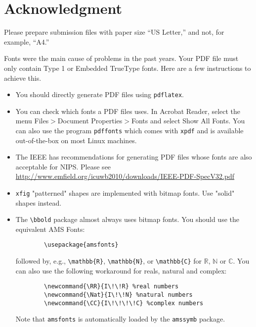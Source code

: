 \documentclass{article}
\begin{document}
	\section{Acknowledgment}
	
	Please prepare submission files with paper size ``US Letter,'' and
	not, for example, ``A4.''
	
	Fonts were the main cause of problems in the past years. Your PDF file
	must only contain Type 1 or Embedded TrueType fonts. Here are a few
	instructions to achieve this.
	
	\begin{itemize}
		
		\item You should directly generate PDF files using \verb+pdflatex+.
		
		\item You can check which fonts a PDF files uses.  In Acrobat Reader,
		select the menu Files$>$Document Properties$>$Fonts and select Show
		All Fonts. You can also use the program \verb+pdffonts+ which comes
		with \verb+xpdf+ and is available out-of-the-box on most Linux
		machines.
		
		\item The IEEE has recommendations for generating PDF files whose
		fonts are also acceptable for NIPS. Please see
		\url{http://www.emfield.org/icuwb2010/downloads/IEEE-PDF-SpecV32.pdf}
		
		\item \verb+xfig+ "patterned" shapes are implemented with bitmap
		fonts.  Use "solid" shapes instead.
		
		\item The \verb+\bbold+ package almost always uses bitmap fonts.  You
		should use the equivalent AMS Fonts:
		\begin{verbatim}
		\usepackage{amsfonts}
		\end{verbatim}
		followed by, e.g., \verb+\mathbb{R}+, \verb+\mathbb{N}+, or
		\verb+\mathbb{C}+ for $\mathbb{R}$, $\mathbb{N}$ or $\mathbb{C}$.  You
		can also use the following workaround for reals, natural and complex:
		\begin{verbatim}
		\newcommand{\RR}{I\!\!R} %real numbers
		\newcommand{\Nat}{I\!\!N} %natural numbers
		\newcommand{\CC}{I\!\!\!\!C} %complex numbers
		\end{verbatim}
		Note that \verb+amsfonts+ is automatically loaded by the
		\verb+amssymb+ package.
		
	\end{itemize}
	
\end{document}
